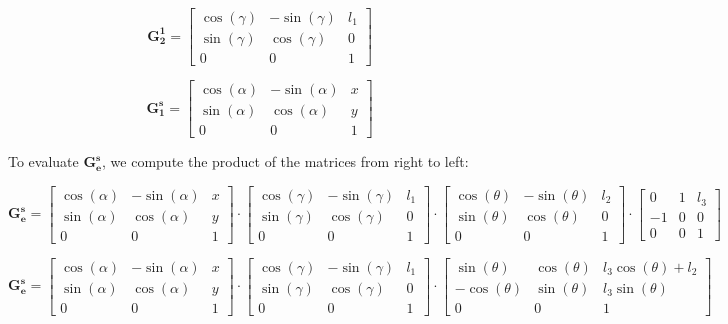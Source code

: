 \documentclass{article}
\begin{document}
\[
\bm{\mathbf{G_{2}^{1}}} =
\begin{bmatrix}
\cos(\gamma) & -\sin(\gamma) & l_1 \\
\sin(\gamma) & \cos(\gamma)  & 0 \\
0 & 0 & 1
\end{bmatrix}
\]

\[
\bm{\mathbf{G_{1}^{s}}} =
\begin{bmatrix}
\cos(\alpha) & -\sin(\alpha) & x \\
\sin(\alpha) & \cos(\alpha)  & y \\
0 & 0 & 1
\end{bmatrix}
\]

To evaluate \(\bm{\mathbf{G^{s}_{e}}}\), we compute the product of the matrices from right to left:

\[
\bm{\mathbf{G^{s}_{e}}} = 
\begin{bmatrix}
\cos(\alpha) & -\sin(\alpha) & x \\
\sin(\alpha) & \cos(\alpha)  & y \\
0 & 0 & 1
\end{bmatrix} \cdot
\begin{bmatrix}
\cos(\gamma) & -\sin(\gamma) & l_1 \\

\sin(\gamma) & \cos(\gamma)  & 0 \\
0 & 0 & 1
\end{bmatrix} \cdot
\begin{bmatrix}
\cos(\theta) & -\sin(\theta) & l_2 \\
\sin(\theta) & \cos(\theta)  & 0 \\
0 & 0 & 1
\end{bmatrix} \cdot
\begin{bmatrix}
0 & 1 & l_3 \\
-1 & 0 & 0 \\
0 & 0 & 1
\end{bmatrix} 
\]

\[
\bm{\mathbf{G^{s}_{e}}} = 
\begin{bmatrix}
\cos(\alpha) & -\sin(\alpha) & x \\
\sin(\alpha) & \cos(\alpha)  & y \\
0 & 0 & 1
\end{bmatrix} \cdot
\begin{bmatrix}
\cos(\gamma) & -\sin(\gamma) & l_1 \\

\sin(\gamma) & \cos(\gamma)  & 0 \\
0 & 0 & 1
\end{bmatrix} \cdot
\begin{bmatrix}
\sin(\theta) & \cos(\theta) & l_3 \cos(\theta) + l_2 \\
-\cos(\theta) & \sin(\theta) & l_3 \sin(\theta) \\
0 & 0 & 1
\end{bmatrix}
\]
\end{document}
